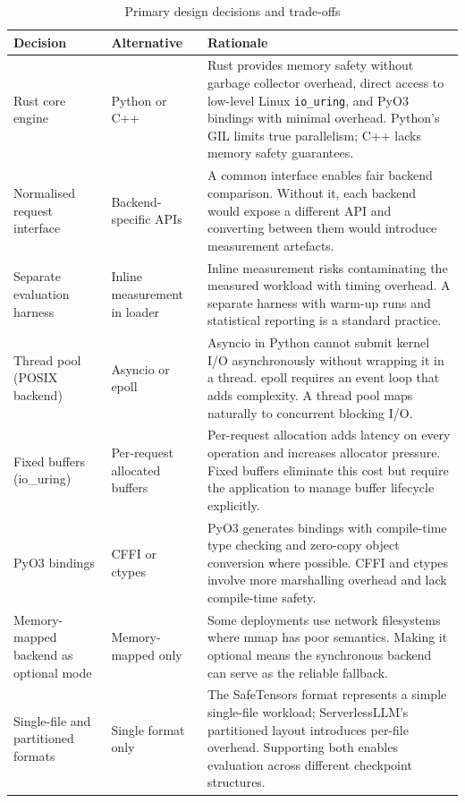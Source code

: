 \begin{table}
\small
\caption{Primary design decisions and trade-offs}
\label{tab:design_decisions}
\centering
\begin{tabular}{p{3cm}p{3.5cm}p{5cm}}
\toprule
\textbf{Decision} & \textbf{Alternative} & \textbf{Rationale} \\
\midrule
Rust core engine & Python or C++ & Rust provides memory safety without garbage collector overhead, direct access to low-level Linux \texttt{io\_uring}, and PyO3 bindings with minimal overhead. Python's GIL limits true parallelism; C++ lacks memory safety guarantees. \\
\midrule
Normalised request interface & Backend-specific APIs & A common interface enables fair backend comparison. Without it, each backend would expose a different API and converting between them would introduce measurement artefacts. \\
\midrule
Separate evaluation harness & Inline measurement in loader & Inline measurement risks contaminating the measured workload with timing overhead. A separate harness with warm-up runs and statistical reporting is a standard practice. \\
\midrule
Thread pool (POSIX backend) & Asyncio or epoll & Asyncio in Python cannot submit kernel I/O asynchronously without wrapping it in a thread. epoll requires an event loop that adds complexity. A thread pool maps naturally to concurrent blocking I/O. \\
\midrule
Fixed buffers (io\_uring) & Per-request allocated buffers & Per-request allocation adds latency on every operation and increases allocator pressure. Fixed buffers eliminate this cost but require the application to manage buffer lifecycle explicitly. \\
\midrule
PyO3 bindings & CFFI or ctypes & PyO3 generates bindings with compile-time type checking and zero-copy object conversion where possible. CFFI and ctypes involve more marshalling overhead and lack compile-time safety. \\
\midrule
Memory-mapped backend as optional mode & Memory-mapped only & Some deployments use network filesystems where mmap has poor semantics. Making it optional means the synchronous backend can serve as the reliable fallback. \\
\midrule
Single-file and partitioned formats & Single format only & The SafeTensors format represents a simple single-file workload; ServerlessLLM's partitioned layout introduces per-file overhead. Supporting both enables evaluation across different checkpoint structures. \\
\bottomrule
\end{tabular}
\normalsize
\end{table}

